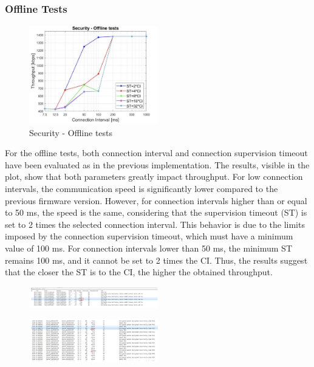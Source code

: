 \documentclass{Configuration_Files/PoliMi3i_thesis}
\begin{document}
\subsubsection*{Offline Tests}

\begin{figure}[H]
    \centering
    \includegraphics[width=0.5\textwidth]{Results Manuel/figure9}
    \caption{Security - Offline tests}
    \label{manuel_results_9}
\end{figure}

For the offline tests, both connection interval and connection supervision timeout have been evaluated as in the previous implementation. The results, visible in the plot, show that both parameters greatly impact throughput. For low connection intervals, the communication speed is significantly lower compared to the previous firmware version. However, for connection intervals higher than or equal to 50 ms, the speed is the same, considering that the supervision timeout (ST) is set to 2 times the selected connection interval. This behavior is due to the limits imposed by the connection supervision timeout, which must have a minimum value of 100 ms. For connection intervals lower than 50 ms, the minimum ST remains 100 ms, and it cannot be set to 2 times the CI. Thus, the results suggest that the closer the ST is to the CI, the higher the obtained throughput.

\begin{figure}[H]
    \centering
    \includegraphics[width=0.5\textwidth]{Results Manuel/figure10}
    \label{manuel_results_10}
\end{figure}

\begin{figure}[H]
    \centering
    \includegraphics[width=0.5\textwidth]{Results Manuel/figure11}
    \label{manuel_results_11}
\end{figure}
\end{document}
